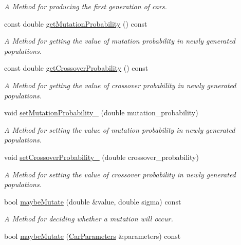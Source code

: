 \begin{DoxyCompactItemize}
\begin{DoxyCompactList}\small\item\em A Method for producing the first generation of cars. \end{DoxyCompactList}\item 
const double \hyperlink{classEvolutionaryAlgorithm_ae2aa7a6fdbfb3a065aecdb7a5488bcc6}{get\+Mutation\+Probability} () const
\begin{DoxyCompactList}\small\item\em A Method for getting the value of mutation probability in newly generated populations. \end{DoxyCompactList}\item 
const double \hyperlink{classEvolutionaryAlgorithm_a71ca76fa04d0824bf7cf86b67fc65414}{get\+Crossover\+Probability} () const
\begin{DoxyCompactList}\small\item\em A Method for getting the value of crossover probability in newly generated populations. \end{DoxyCompactList}\item 
void \hyperlink{classEvolutionaryAlgorithm_a2f47cbcc3c2b886ece5ba97bbfed4178}{set\+Mutation\+Probability\+\_\+} (double mutation\+\_\+probability)
\begin{DoxyCompactList}\small\item\em A Method for setting the value of mutation probability in newly generated populations. \end{DoxyCompactList}\item 
void \hyperlink{classEvolutionaryAlgorithm_ab5951bdd3eec16074aff63349726dee8}{set\+Crossover\+Probability\+\_\+} (double crossover\+\_\+probability)
\begin{DoxyCompactList}\small\item\em A Method for setting the value of crossover probability in newly generated populations. \end{DoxyCompactList}\item 
bool \hyperlink{classEvolutionaryAlgorithm_a19c58cc0434d314fb5378e3674546988}{maybe\+Mutate} (double \&value, double sigma) const
\begin{DoxyCompactList}\small\item\em A Method for deciding whether a mutation will occur. \end{DoxyCompactList}\item 
bool \hyperlink{classEvolutionaryAlgorithm_ac144c241688bbe9a50c7ce98f6895ba2}{maybe\+Mutate} (\hyperlink{classCarParameters}{Car\+Parameters} \&parameters) const

\end{DoxyCompactItemize}
